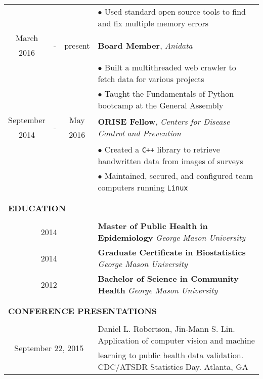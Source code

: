 \documentclass[10pt]{article}
\begin{document}
\begin{table}[ht]
\begin{tabular}{@{\hspace{0mm}}c@{\hspace{1mm}}c@{\hspace{3mm}}cl}
            & & & $\bullet$ Used standard open source tools to find and fix multiple memory errors\\
            March & \multirow{2}{*}{-} & \multirow{2}{*}{present} & \multirow{2}{*}{\textbf{Board Member}, \textit{Anidata}}\\
            2016 & & &\\
            & & & $\bullet$ Built a multithreaded web crawler to fetch data for various projects\\
            & & & $\bullet$ Taught the Fundamentals of Python bootcamp at the General Assembly\\
            September & \multirow{2}{*}{-} & May & \multirow{2}{*}{\textbf{ORISE Fellow}, \textit{Centers for Disease Control and Prevention}}\\
            2014 & & 2016 &\\
            & & & $\bullet$ Created a \texttt{C++} library to retrieve handwritten data from images of surveys\\
            & & & $\bullet$ Maintained, secured, and configured team computers running \texttt{Linux}\\\\[-2mm]
            \hline\\[-3mm]
            \multicolumn{4}{l}{\large{\textbf{EDUCATION}}}\\
            \hline\\[-2mm]
            \multicolumn{3}{c}{2014} & \textbf{Master of Public Health in Epidemiology} \textit{George Mason University}\\[1mm]
            \multicolumn{3}{c}{2014} & \textbf{Graduate Certificate in Biostatistics} \textit{George Mason University}\\[1mm]
            \multicolumn{3}{c}{2012} & \textbf{Bachelor of Science in Community Health} \textit{George Mason University}\\\\[-2mm]
            \hline\\[-3mm]
            \multicolumn{4}{l}{\large{\textbf{CONFERENCE PRESENTATIONS}}}\\
            \hline\\[-2mm]
            \multicolumn{3}{c}{\multirow{2}{*}{September 22, 2015}} & Daniel L. Robertson, Jin-Mann S. Lin. Application of computer vision and machine\\
            & & & learning to public health data validation. CDC/ATSDR Statistics Day. Atlanta, GA\\
        \end{tabular}
    \end{table}
\end{document}
